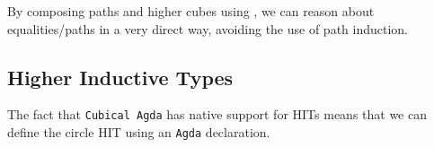 
By composing paths and higher cubes using , we can reason
about equalities/paths in a very direct way, avoiding the use of path
induction.

\subsection{Higher Inductive Types}
\label{sec:hits}

The fact that \texttt{Cubical Agda} has native support for HITs means that we
can define the circle HIT using an \texttt{Agda}  declaration.


